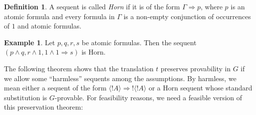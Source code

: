 \documentclass[12pt,a4paper]{article}
\theoremstyle{plain}
\theoremstyle{definition}
\newtheorem{definition}[theorem]{Definition}
\newtheorem{example}[theorem]{Example}
\begin{document}
\begin{definition}\label{ImplicationalHorn}
A sequent is called \emph{Horn} if it is of the form $\Gamma \Rightarrow p$, where $p$ is an atomic formula and every formula in $\Gamma$ is a non-empty conjunction of occurrences of $1$ and atomic formulas.
\end{definition}

\begin{example}
Let $p, q, r, s$ be atomic formulas. Then the sequent $(p \wedge q, r \wedge 1, 1 \wedge 1 \Rightarrow s)$ is Horn.
\end{example}

The following theorem shows that the translation $t$ preserves provability in $G$ if we allow some ``harmless'' sequents among the assumptions. By harmless, we mean either a sequent of the form $\langle !A \rangle \Rightarrow !\langle !A \rangle$ or a Horn sequent whose standard substitution is $G$-provable. For feasibility reasons, we need a feasible version of this preservation theorem:
\end{document}

